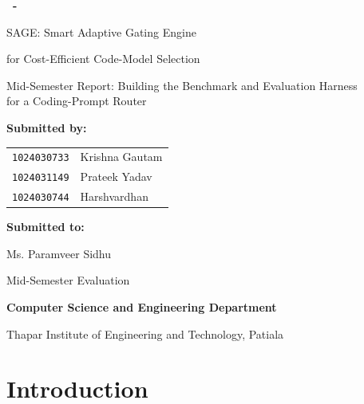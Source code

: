 \begin{titlepage}
\centering
\vspace*{0.6in}
{\bfseries \coursecode\ - \coursetitle\par}
\vspace{0.55in}
{\LARGE SAGE: Smart Adaptive Gating Engine\par}
\vspace{4pt}
{\large for Cost-Efficient Code-Model Selection\par}
\vspace{8pt}
{\small Mid-Semester Report: Building the Benchmark and Evaluation Harness\\ for a Coding-Prompt Router\par}
\vspace{0.75in}
{\bfseries\large Submitted by:\par}
\vspace{6pt}
\begin{tabular}{l l}
\texttt{1024030733} & Krishna Gautam\\
\texttt{1024031149} & Prateek Yadav\\
\texttt{1024030744} & Harshvardhan\\
\end{tabular}\par
\vspace{0.8in}
{\bfseries\large Submitted to:\par}
\vspace{6pt}
{\small Ms. Paramveer Sidhu\par}
\vfill
{Mid-Semester Evaluation\par}
\vspace{4pt}
{\bfseries Computer Science and Engineering Department\par}
\vspace{2pt}
{\small Thapar Institute of Engineering and Technology, Patiala\par}
\vspace*{0.4in}
\end{titlepage}

\tableofcontents

\chapter{Introduction}

